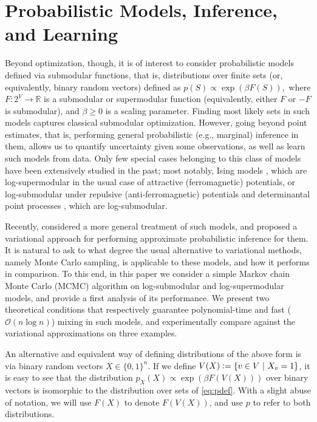 \section{Probabilistic Models, Inference, and Learning}


Beyond optimization, though, it is of interest to consider probabilistic models defined via submodular functions, that is, distributions over finite sets (or, equivalently, binary random vectors) defined as $p(S) \propto \exp(\beta F(S)),$ where $F : 2^V \to \mathbb{R}$ is a submodular or supermodular function (equivalently, either $F$ or $-F$ is submodular), and $\beta \geq 0$ is a scaling parameter.
Finding most likely sets in such models captures classical submodular optimization.
However, going beyond point estimates, that is, performing general probabilistic (e.g., marginal) inference in them, allows us to quantify uncertainty given some observations, as well as learn such models from data.
Only few special cases belonging to this class of models have been extensively studied in the past; most notably, Ising models \cite{koller09}, which are log-supermodular in the usual case of attractive (ferromagnetic) potentials, or log-submodular under repulsive (anti-ferromagnetic) potentials and determinantal point processes \cite{kulesza12}, which are log-submodular.

Recently, \citet{djolonga14} considered a more general treatment of such models, and proposed a variational approach for performing approximate probabilistic inference for them.
It is natural to ask to what degree the usual alternative to variational methods, namely Monte Carlo sampling, is applicable to these models, and how it performs in comparison.
To this end, in this paper we consider a simple Markov chain Monte Carlo (MCMC) algorithm on log-submodular and log-supermodular models, and provide a first analysis of its performance.
We present two theoretical conditions that respectively guarantee polynomial-time and fast ($\mathcal{O}(n \log n)$) mixing in such models, and experimentally compare against the variational approximations on three examples.

An alternative and equivalent way of defining distributions of the above form is via binary random vectors $X \in \{0, 1\}^n$.
If we define $V(X) \vcentcolon= \left\{v \in V\ \middle\vert\  X_v = 1\right\}$, it is easy to see that the distribution $p_X(X) \propto \exp(\beta F(V(X)))$ over binary vectors is isomorphic to the distribution over sets of \eqref{eq:pdef}.
With a slight abuse of notation, we will use $F(X)$ to denote $F(V(X))$, and use $p$ to refer to both distributions.


